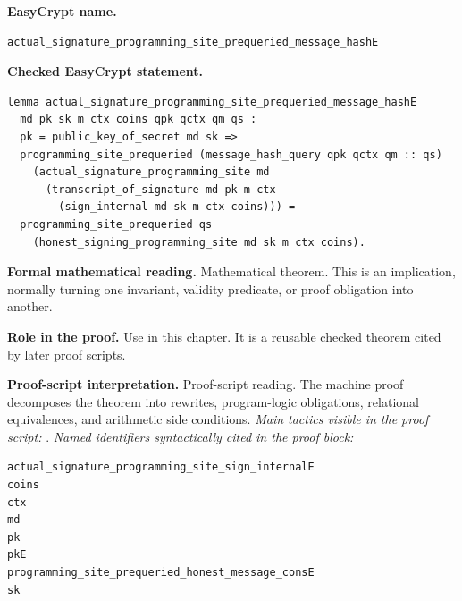\begin{formaltheorem}
\noindent\textbf{EasyCrypt name.}
\begin{lstlisting}[language=EasyCrypt,basicstyle=\ttfamily\scriptsize]
actual_signature_programming_site_prequeried_message_hashE
\end{lstlisting}
\noindent\textbf{Checked EasyCrypt statement.}
\begin{lstlisting}[language=EasyCrypt,basicstyle=\ttfamily\scriptsize]
lemma actual_signature_programming_site_prequeried_message_hashE
  md pk sk m ctx coins qpk qctx qm qs :
  pk = public_key_of_secret md sk =>
  programming_site_prequeried (message_hash_query qpk qctx qm :: qs)
    (actual_signature_programming_site md
      (transcript_of_signature md pk m ctx
        (sign_internal md sk m ctx coins))) =
  programming_site_prequeried qs
    (honest_signing_programming_site md sk m ctx coins).
\end{lstlisting}
\noindent\textbf{Formal mathematical reading.}
Mathematical theorem. This is an implication, normally turning one invariant, validity predicate, or proof obligation into another.

\noindent\textbf{Role in the proof.}
Use in this chapter. It is a reusable checked theorem cited by later proof scripts.

\noindent\textbf{Proof-script interpretation.}
Proof-script reading. The machine proof decomposes the theorem into rewrites, program-logic obligations, relational equivalences, and arithmetic side conditions.
\emph{Main tactics visible in the proof script:} .
\emph{Named identifiers syntactically cited in the proof block:}
\begin{lstlisting}[language=EasyCrypt,basicstyle=\ttfamily\scriptsize]
actual_signature_programming_site_sign_internalE
coins
ctx
md
pk
pkE
programming_site_prequeried_honest_message_consE
sk
\end{lstlisting}

\end{formaltheorem}

